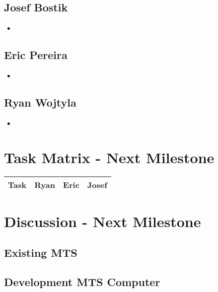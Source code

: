 \documentclass[12pt]{article}
\begin{document}
\subsection{Josef Bostik}

\begin{itemize}
\item
\end{itemize}

\subsection{Eric Pereira}

\begin{itemize}
\item
\end{itemize}

\subsection{Ryan Wojtyla}

\begin{itemize}
\item
\end{itemize}

\section{Task Matrix - Next Milestone}

\begin{center}
  \begin{tabular}{|c|c|c|c|}
    \hline
    Task & Ryan & Eric & Josef \\
    \hline
    
    \hline
  \end{tabular}
\end{center}

\section{Discussion - Next Milestone}

\subsection{Existing MTS}



\subsection{Development MTS Computer}
\end{document}
